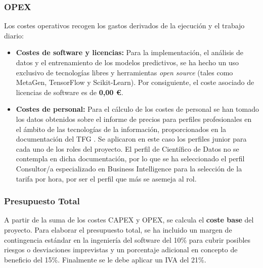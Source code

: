 \subsubsection{OPEX}
Los costes operativos recogen los gastos derivados de la ejecución y el trabajo diario:
\begin{itemize}
	\item \textbf{Costes de software y licencias:} Para la implementación, el análisis de datos y el entrenamiento de los modelos predictivos, se ha hecho un uso exclusivo de tecnologías libres y herramientas \textit{open source} (tales como MetaGen, TensorFlow y Scikit-Learn). Por consiguiente, el coste asociado de licencias de software es de \textbf{0,00 \euro}.
	\item \textbf{Costes de personal:} Para el cálculo de los costes de personal se han tomado los datos obtenidos sobre el informe de precios para perfiles profesionales en el ámbito de las tecnologías de la información, proporcionados en la documentación del TFG \cite{precio-perfiles}. Se aplicaron en este caso los perfiles junior para cada uno de los roles del proyecto. El perfil de Científico de Datos no se contempla en dicha documentación, por lo que se ha seleccionado el perfil Consultor/a especializado en Business Intelligence para la selección de la tarifa por hora, por ser el perfil que más se asemeja al rol.
\end{itemize}



\subsubsection{Presupuesto Total}
A partir de la suma de los costes CAPEX y OPEX, se calcula el \textbf{coste base} del proyecto. Para elaborar el presupuesto total, se ha incluido un margen de contingencia estándar en la ingeniería del software del 10\% para cubrir posibles riesgos o desviaciones imprevistas y un porcentaje adicional en concepto de beneficio del 15\%. Finalmente se le debe aplicar un IVA del 21\%.

